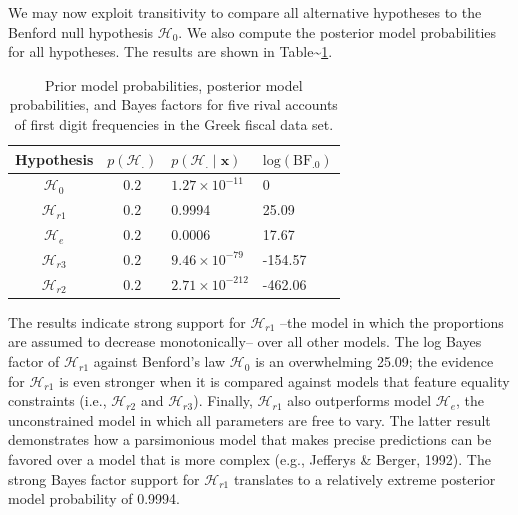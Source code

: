 \documentclass[
  english,
  man,floatsintext]{apa6}
\begin{document}
We may now exploit transitivity to compare all alternative hypotheses to the Benford null hypothesis \(\mathcal{H}_{0}\). We also compute the posterior model probabilities for all hypotheses. The results are shown in Table\textasciitilde{}\ref{Tab:benfordResults}.

\begin{table}[H]
    \centering
    \caption{Prior model probabilities, posterior model probabilities, and Bayes factors for five rival accounts of first digit frequencies in the Greek fiscal data set.}
    \begin{tabular}{ccll}
        \hline Hypothesis &  $p(\mathcal{H}_{.})$ & $p(\mathcal{H}_{.} \mid \mathbf{x})$ & $\text{log}(\text{BF}_{.0})$ \\
        \hline
        $\mathcal{H}_{0}$  & $0.2$  &
        $1.27 \times 10^{-11}$ & $0$ \\
        $\mathcal{H}_{r1}$ & $0.2$ &
        0.9994 & 
        25.09\\
        $\mathcal{H}_{e}$  & $0.2$ &
        0.0006 & 
        17.67\\
        $\mathcal{H}_{r3}$ & $0.2$ &
        $9.46 \times 10^{-79}$ &
        -154.57\\
        $\mathcal{H}_{r2}$ & $0.2$ &
        $2.71 \times 10^{-212}$ & 
        -462.06\\
        \hline
    \end{tabular}
    \label{Tab:benfordResults}
\end{table}

The results indicate strong support for \(\mathcal{H}_{r1}\) --the model in which the proportions are assumed to decrease monotonically-- over all other models. The log Bayes factor of \(\mathcal{H}_{r1}\) against Benford's law \(\mathcal{H}_0\) is an overwhelming 25.09; the evidence for \(\mathcal{H}_{r1}\) is even stronger when it is compared against models that feature equality constraints (i.e., \(\mathcal{H}_{r2}\) and \(\mathcal{H}_{r3}\)). Finally, \(\mathcal{H}_{r1}\) also outperforms model \(\mathcal{H}_{e}\), the unconstrained model in which all parameters are free to vary. The latter result demonstrates how a parsimonious model that makes precise predictions can be favored over a model that is more complex (e.g., Jefferys \& Berger, 1992). The strong Bayes factor support for \(\mathcal{H}_{r1}\) translates to a relatively extreme posterior model probability of 0.9994.
\end{document}

